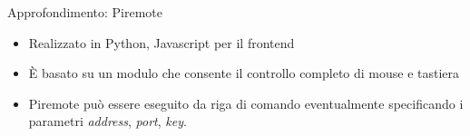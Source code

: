\documentclass{beamer}
\begin{document}
\begin{frame}{Approfondimento: Piremote}

\begin{itemize}

\item Realizzato in Python, Javascript per il frontend
\item È basato su un modulo che consente il controllo completo di mouse e tastiera
\item Piremote può essere eseguito da riga di comando eventualmente specificando i parametri \textit{address}, \textit{port}, \textit{key}.

\end{itemize}

\end{frame}
\end{document}
